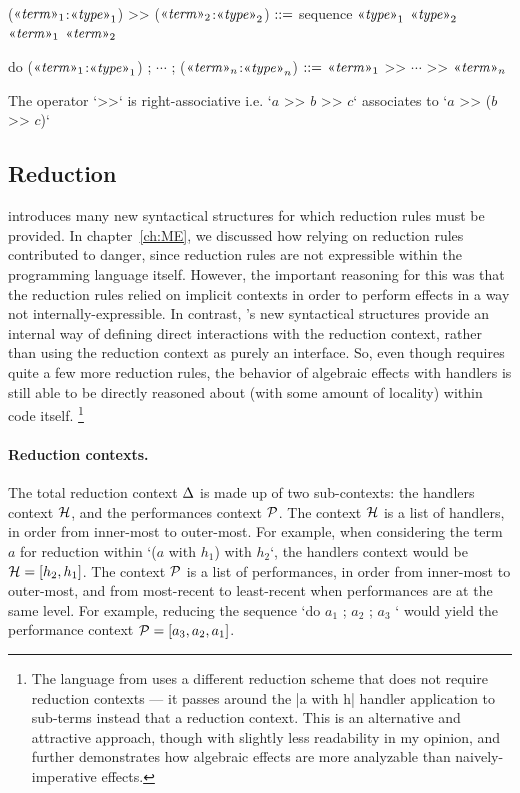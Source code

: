 \begin{notational}[caption={Notations for sequencing}]
($\mvar{term}_1$:$\mvar{type}_1$) >> ($\mvar{term}_2$:$\mvar{type}_2$)
  $\syneq$
    sequence $\mvar{type}_1$ $\mvar{type}_2$ $\mvar{term}_1$ $\mvar{term}_2$

do{ ($\mvar{term}_1$:$\mvar{type}_1$) ; $\cdots$ ; ($\mvar{term}_n$:$\mvar{type}_n$) }
  $\syneq$
    $\mvar{term}_1$ >> $\cdots$ >> $\mvar{term}_n$
\end{notational}
The operator \code`>>` is right-associative i.e.
\code`$a$ >> $b$ >> $c$` associates to \code`$a$ >> ($b$ >> $c$)`

\subsection{Reduction}
\label{sec:LangD-reduction}

\LangD introduces many new syntactical structures for which reduction rules must be provided.
In chapter~\ref{ch:ME}, we discussed how relying on reduction rules contributed to danger, since reduction rules are not expressible within the programming language itself.
However, the important reasoning for this was that the reduction rules relied on implicit contexts in order to perform effects in a way not internally-expressible.
In contrast, \LangD's new syntactical structures provide an internal way of defining direct interactions with the reduction context, rather than using the reduction context as purely an interface.
So, even though \LangD requires quite a few more reduction rules, the behavior of algebraic effects with handlers is still able to be directly reasoned about (with some amount of locality) within \LangD code itself.%
\footnote{
  The language  from \cite{Bauer2015ProgrammingWA} uses a different reduction scheme that does not require reduction contexts --- it passes around the \code|a with h| handler application to sub-terms instead that a reduction context.
  This is an alternative and attractive approach, though with slightly less readability in my opinion, and further demonstrates how algebraic effects are more analyzable than naively-imperative effects.
}

\paragraph{Reduction contexts.}
The total reduction context $\rctx$ is made up of two sub-contexts:
the handlers context $\hctx$, and
the performances context $\pctx$.
The context $\hctx$ is a list of handlers, in order from inner-most to outer-most.
For example, when considering the term $a$ for reduction within \code`($a$ with $h_1$) with $h_2$`,
the handlers context would be $\hctx = [h_2, h_1]$.
The context $\pctx$ is a list of performances, in order from inner-most to outer-most, and from most-recent to least-recent when performances are at the same level.
For example, reducing the sequence \code`do{ $a_1$ ; $a_2$ ; $a_3$ }` would yield the performance context $\pctx = [a_3, a_2, a_1]$.

